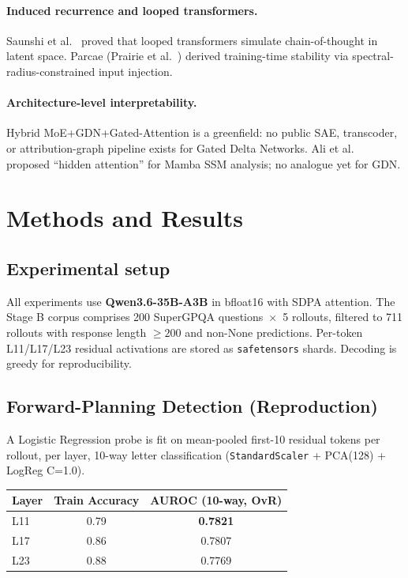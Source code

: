 \documentclass[11pt]{article}
\begin{document}
\paragraph{Induced recurrence and looped transformers.} Saunshi et al.~\cite{saunshi2024looped} proved that looped transformers simulate chain-of-thought in latent space. Parcae (Prairie et al.~\cite{prairie2026parcae}) derived training-time stability via spectral-radius-constrained input injection.

\paragraph{Architecture-level interpretability.} Hybrid MoE+GDN+Gated-Attention is a greenfield: no public SAE, transcoder, or attribution-graph pipeline exists for Gated Delta Networks. Ali et al.~\cite{ali2024hidden} proposed ``hidden attention'' for Mamba SSM analysis; no analogue yet for GDN.

\section{Methods and Results}

\subsection{Experimental setup}
All experiments use \textbf{Qwen3.6-35B-A3B} in bfloat16 with SDPA attention. The Stage B corpus comprises 200 SuperGPQA questions~$\times$~5 rollouts, filtered to 711 rollouts with response length $\geq 200$ and non-None predictions. Per-token L11/L17/L23 residual activations are stored as \texttt{safetensors} shards. Decoding is greedy for reproducibility.

\subsection{Forward-Planning Detection (Reproduction)}\label{sec:detection}

A Logistic Regression probe is fit on mean-pooled first-10 residual tokens per rollout, per layer, 10-way letter classification (\texttt{StandardScaler} + PCA(128) + LogReg C=1.0).

\begin{table}[h]
\centering
\begin{tabular}{lcc}
\toprule
Layer & Train Accuracy & AUROC (10-way, OvR) \\
\midrule
L11 & 0.79 & \textbf{0.7821} \\
L17 & 0.86 & 0.7807 \\
L23 & 0.88 & 0.7769 \\
\bottomrule
\end{tabular}
\end{table}
\end{document}
